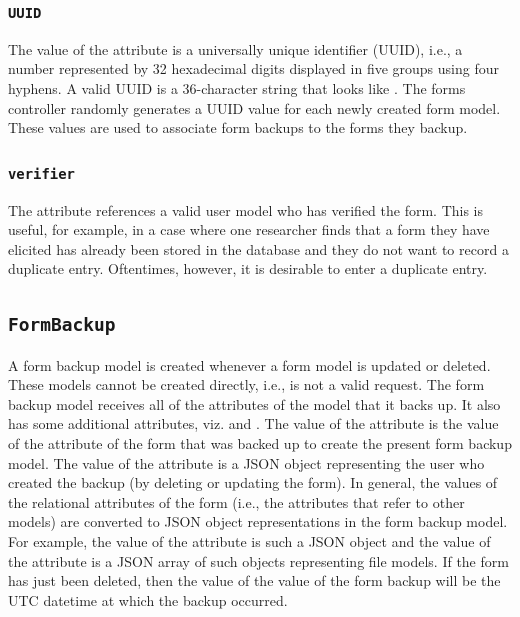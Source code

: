 \documentclass[letterpaper,10pt,english]{sphinxmanual}
\begin{document}
\subsubsection{\texttt{UUID}}
\label{datastructure:id28}
The value of the  attribute is a universally unique identifier (UUID),
i.e., a number represented by 32 hexadecimal digits displayed in five groups
using four hyphens.  A valid UUID is a 36-character string that looks like
.  The forms controller randomly
generates a UUID value for each newly created form model.  These values are used
to associate form backups to the forms they backup.


\subsubsection{\texttt{verifier}}
\label{datastructure:verifier}
The  attribute references a valid user model who has verified the
form.  This is useful, for example, in a case where one researcher finds that a
form they have elicited has already been stored in the database and they do not
want to record a duplicate entry.  Oftentimes, however, it is desirable to enter
a duplicate entry.


\subsection{\texttt{FormBackup}}
\label{datastructure:form-backup-data-structure}\label{datastructure:formbackup}
A form backup model is created whenever a form model is updated or deleted.
These models cannot be created directly, i.e.,  is not a
valid request.  The form backup model receives all of the attributes of the
model that it backs up.  It also has some additional attributes, viz.
 and .  The value of the  attribute is the
value of the  attribute of the form that was backed up to create the
present form backup model.  The value of the  attribute is a JSON
object representing the user who created the backup (by deleting or updating the
form).  In general, the values of the relational attributes of the form (i.e.,
the attributes that refer to other models) are converted to JSON object
representations in the form backup model.  For example, the value of the
 attribute is such a JSON object and the value of the 
attribute is a JSON array of such objects representing file models.  If the form
has just been deleted, then the value of the  value of the
form backup will be the UTC datetime at which the backup occurred.
\end{document}
